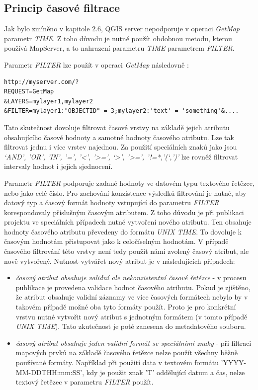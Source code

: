 \subsection{Princip časové filtrace}
Jak bylo zmíněno v kapitole 2.6, QGIS server nepodporuje v operaci \textit{GetMap} parametr \textit{TIME}. Z toho důvodu je nutné použít obdobnou metodu, kterou používá MapServer, a to nahrazení parametru \textit{TIME} parametrem \textit{FILTER}.

\noindent
Parametr \textit{FILTER} lze použít v operaci \textit{GetMap} následovně \cite{qgis-service}:
\begin{verbatim}
http://myserver.com/?
REQUEST=GetMap
&LAYERS=mylayer1,mylayer2
&FILTER=mylayer1:"OBJECTID" = 3;mylayer2:'text' = 'something'&....
\end{verbatim}

Tato skutečnost dovoluje filtrovat časové vrstvy na základě jejich atributu obsahujícího časové hodnoty a samotné hodnoty časového atributu. Lze tak filtrovat jednu i více vrstev najednou. Za použití speciálních znaků jako jsou \textit{‘AND’, ’OR’, ’IN’, ’=’, ’<’, ’>=’,  ‘>’, ’>=’, ’!=*,’(‘,’)’} lze rovněž filtrovat intervaly hodnot i jejich sjednocení.

Parametr \textit{FILTER} podporuje zadané hodnoty ve datovém typu textového řetězce, nebo jako celé číslo. Pro zachování konzistence výsledků filtrování je nutné, aby datový typ a časový formát hodnoty vstupující do parametru \textit{FILTER} korespondovaly příslušným časovým atributem. Z toho důvodu je při publikaci projektu ve speciálních případech nutné vytvoření nového atributu. Ten obsahuje hodnoty časového atributu převedeny do formátu \textit{UNIX TIME}. To dovoluje k časovým hodnotám přistupovat jako k celočíselným hodnotám. V případě časového filtrování této vrstvy není tedy použit námi zvolený časový atribut, ale nově vytvořený. Nutnost vytvářet nový atribut je v následujících případech:

\begin{itemize}
	\item\textit{časový atribut obsahuje validní ale nekonzistentní časové řetězce} - v procesu publikace je provedena validace hodnot časového atributu. Pokud je zjištěno, že atribut obsahuje validní záznamy ve více časových formátech nebylo by v takovém případě možné oba tyto formáty použít. Proto je pro konkrétní vrstvu nutné vytvořit nový atribut s jednotným formátem (v tomto případě \textit{UNIX TIME}). Tato zkutečnost je poté zanesena do metadatového souboru.
	\item\textit{časový atribut obsahuje jeden validní formát se speciálními znaky} - při filtraci mapových prvků na základě časového řetězce nelze použít všechny běžně používané formáty. Například při použití data v textovém formátu 'YYYY-MM-DDTHH:mm:SS', kdy je použit znak 'T' oddělující datum a čas, nelze textový řetězec v parametru \textit{FILTER} použít.
\end{itemize}


